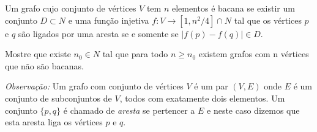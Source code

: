 Um grafo cujo conjunto de vértices $V$ tem $n$ elementos é bacana se existir um conjunto $D \subset N$ e uma função injetiva $f: V \to [1, n^2/4] \cap N$ tal que os vértices $p$ e $q$ são ligados por uma aresta se e somente se $|f(p)-f(q)| \in D$.

Mostre que existe $n_0 \in N$ tal que para todo $n \ge n_0$ existem grafos com n vértices que não são bacanas.

\textit{Observação:} Um grafo com conjunto de vértices $V$ é um par $(V, E)$ onde $E$ é um conjunto de subconjuntos de $V$, todos com exatamente dois elementos.
Um conjunto $\{p,q\}$ é chamado de \textit{aresta} se pertencer a $E$ e neste caso dizemos que esta aresta liga os vértices $p$ e $q$.